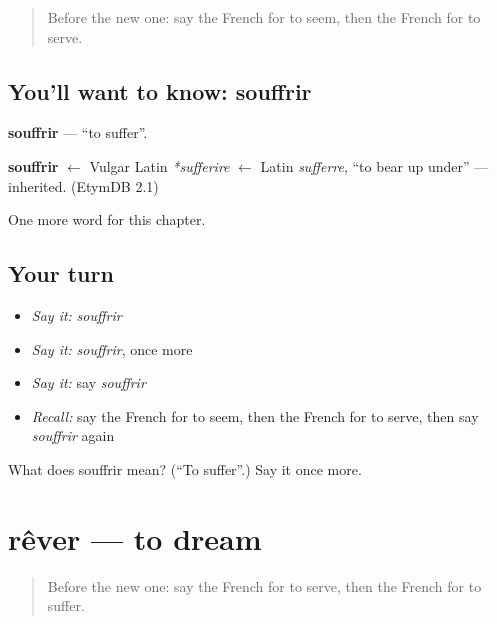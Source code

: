 \label{lesson:FR-C149-souffrir}



\begin{quote}
Before the new one: say the French for to seem, then the French for to serve.
\end{quote}

\subsection*{You'll want to know: souffrir}
\textbf{souffrir} — \textquotedblleft{}to suffer\textquotedblright{}.

\begin{cousinweb}
\textbf{souffrir} $\leftarrow$ Vulgar Latin \emph{*sufferire} $\leftarrow$ Latin \emph{sufferre}, \textquotedblleft{}to bear up under\textquotedblright{} — inherited. (EtymDB 2.1)
\end{cousinweb}

\begin{grammarlens}[title={What you've built}]
One more word for this chapter.
\end{grammarlens}

\subsection*{Your turn}
\begin{itemize}
\raggedright
  \item \emph{Say it:} \emph{souffrir}
  \item \emph{Say it:} \emph{souffrir}, once more
  \item \emph{Say it:} say \emph{souffrir}
  \item \emph{Recall:} say the French for to seem, then the French for to serve, then say \emph{souffrir} again
\end{itemize}

\begin{tcolorbox}[breakable,colback=teal!4,colframe=teal!35!black,title={Before you move on}]
What does souffrir mean? (\textquotedblleft{}To suffer\textquotedblright{}.) Say it once more.
\end{tcolorbox}
\section[rêver]{rêver — to dream}

\label{lesson:FR-C149-rever}



\begin{quote}
Before the new one: say the French for to serve, then the French for to suffer.
\end{quote}

